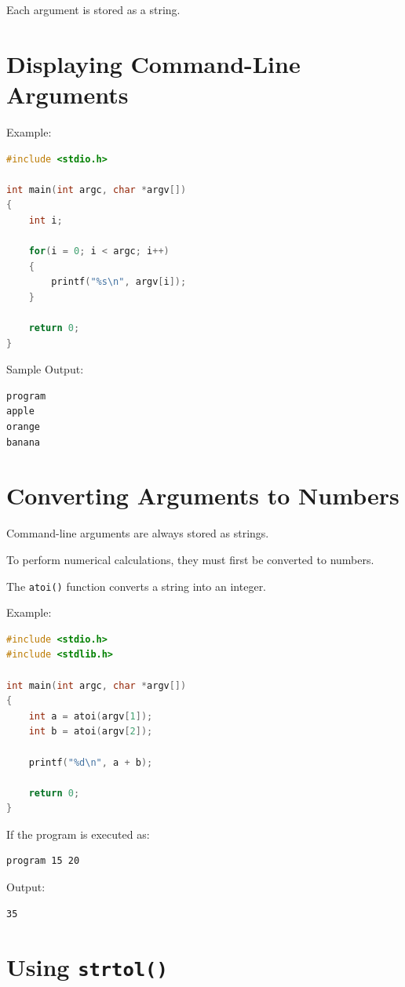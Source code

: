 \documentclass[12pt,openany]{book}
\begin{document}
Each argument is stored as a string.

\section{Displaying Command-Line Arguments}

Example:

\begin{lstlisting}[language=C]
#include <stdio.h>

int main(int argc, char *argv[])
{
    int i;

    for(i = 0; i < argc; i++)
    {
        printf("%s\n", argv[i]);
    }

    return 0;
}
\end{lstlisting}

Sample Output:

\begin{lstlisting}
program
apple
orange
banana
\end{lstlisting}
\section{Converting Arguments to Numbers}

Command-line arguments are always stored as strings.

To perform numerical calculations, they must first be converted to numbers.

The \texttt{atoi()} function converts a string into an integer.

Example:

\begin{lstlisting}[language=C]
#include <stdio.h>
#include <stdlib.h>

int main(int argc, char *argv[])
{
    int a = atoi(argv[1]);
    int b = atoi(argv[2]);

    printf("%d\n", a + b);

    return 0;
}
\end{lstlisting}

If the program is executed as:

\begin{lstlisting}
program 15 20
\end{lstlisting}

Output:

\begin{lstlisting}
35
\end{lstlisting}

\section{Using \texttt{strtol()}}
\end{document}
